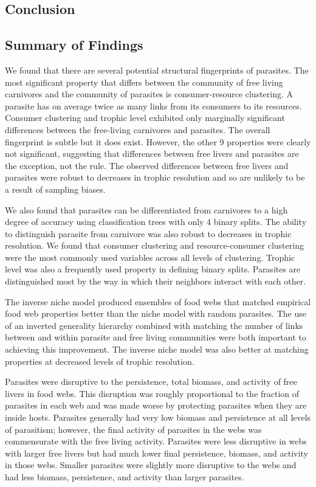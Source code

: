 \documentclass[../dissertation.tex]{subfiles}
\begin{document}
\begin{bibunit}

\chapter{Conclusion}

\section{Summary of Findings}

We found that there are several potential structural fingerprints of parasites.
The most significant property that differs between the community of free living
carnivores and the community of parasites is consumer-resource clustering.  A
parasite has on average twice as many links from its consumers to its
resources. Consumer clustering and trophic level exhibited only marginally
significant differences between the free-living carnivores and parasites. The
overall fingerprint is subtle but it does exist.  However, the other 9
properties were clearly not significant, suggesting that differences between
free livers and parasites are the exception, not the rule. The observed
differences between free livers and parasites were robust to decreases in
trophic resolution and so are unlikely to be a result of sampling biases.

We also found that parasites can be differentiated from carnivores to a high
degree of accuracy using classification trees with only 4 binary splits. The
ability to distinguish parasite from carnivore was also robust to decreases in
trophic resolution. We found that consumer clustering and resource-consumer
clustering were the most commonly used variables across all levels of
clustering. Trophic level was also a frequently used property in defining
binary splits. Parasites are distinguished most by the way in which
their neighbors interact with each other.

The inverse niche model produced ensembles of food webs that matched empirical
food web properties better than the niche model with random parasites. The use
of an inverted generality hierarchy combined with matching the number of links
between and within parasite and free living communities were both important to
achieving this improvement. The inverse niche model was also better at matching
properties at decreased levels of trophic resolution.

Parasites were disruptive to the persistence, total biomass, and activity of
free livers in food webs. This disruption was roughly proportional to the
fraction of parasites in each web and was made worse by protecting parasites
when they are inside hosts. Parasites generally had very low biomass and
persistence at all levels of parasitism; however, the final activity of
parasites in the webs was commensurate with the free living activity. Parasites
were less disruptive in webs with larger free livers but had much lower final
persistence, biomass, and activity in those webs. Smaller parasites were
slightly more disruptive to the webs and had less biomass, persistence, and
activity than larger parasites.


\end{bibunit}
\end{document}
